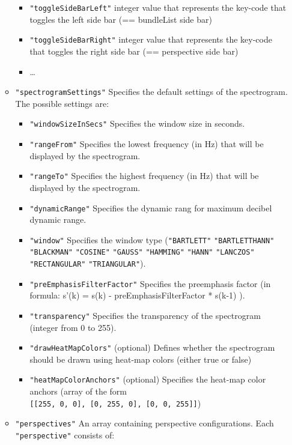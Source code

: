 \documentclass[]{book}
\theoremstyle{definition}
\theoremstyle{definition}
\theoremstyle{definition}
\theoremstyle{remark}
\begin{document}
\begin{itemize}
\begin{itemize}
    \begin{itemize}
    \item
      \texttt{"toggleSideBarLeft"} integer value that represents the
      key-code that toggles the left side bar (== bundleList side bar)
    \item
      \texttt{"toggleSideBarRight"} integer value that represents the
      key-code that toggles the right side bar (== perspective side bar)
    \item
      \ldots{}
    \end{itemize}
  \item
    \texttt{"spectrogramSettings"} Specifies the default settings of the
    spectrogram. The possible settings are:

    \begin{itemize}
    \item
      \texttt{"windowSizeInSecs"} Specifies the window size in seconds.
    \item
      \texttt{"rangeFrom"} Specifies the lowest frequency (in Hz) that
      will be displayed by the spectrogram.
    \item
      \texttt{"rangeTo"} Specifies the highest frequency (in Hz) that
      will be displayed by the spectrogram.
    \item
      \texttt{"dynamicRange"} Specifies the dynamic rang for maximum
      decibel dynamic range.
    \item
      \texttt{"window"} Specifies the window type (\texttt{"BARTLETT"}
      \texttt{"BARTLETTHANN"} \texttt{"BLACKMAN"} \texttt{"COSINE"}
      \texttt{"GAUSS"} \texttt{"HAMMING"} \texttt{"HANN"}
      \texttt{"LANCZOS"} \texttt{"RECTANGULAR"} \texttt{"TRIANGULAR"}).
    \item
      \texttt{"preEmphasisFilterFactor"} Specifies the preemphasis
      factor (in formula: s'(k) = s(k) - preEmphasisFilterFactor *
      s(k-1) ).
    \item
      \texttt{"transparency"} Specifies the transparency of the
      spectrogram (integer from 0 to 255).
    \item
      \texttt{"drawHeatMapColors"} (optional) Defines whether the
      spectrogram should be drawn using heat-map colors (either true or
      false)
    \item
      \texttt{"heatMapColorAnchors"} (optional) Specifies the heat-map
      color anchors (array of the form
      \texttt{{[}{[}255,\ 0,\ 0{]},\ {[}0,\ 255,\ 0{]},\ {[}0,\ 0,\ 255{]}{]}})
    \end{itemize}
  \item
    \texttt{"perspectives"} An array containing perspective
    configurations. Each \texttt{"perspective"} consists of:


\end{itemize}
\end{itemize}
\end{document}
